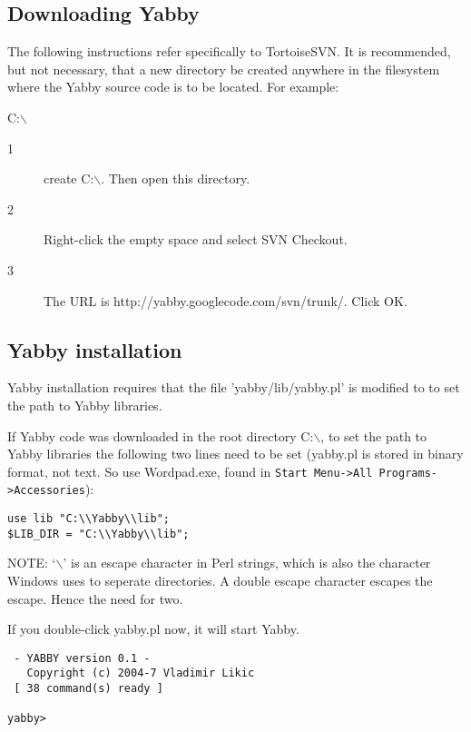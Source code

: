 \subsection{Downloading Yabby}

The following instructions refer specifically to TortoiseSVN. It is
recommended, but not necessary, that a new directory be created anywhere in
the filesystem where the Yabby source code is to be located. For example:

C:{$\backslash$}
\begin{description}
  \item[1] create C:{$\backslash$}. Then open this directory.
  
  \item[2] Right-click the empty space and select SVN Checkout.
  
  \item[3] The URL is http://yabby.googlecode.com/svn/trunk/. Click OK.
\end{description}

\subsection{Yabby installation}

Yabby installation requires that the file 'yabby/lib/yabby.pl' is modified to
to set the path to Yabby libraries.

If Yabby code was downloaded in the root directory C:$\backslash$, to set
the path to Yabby libraries the following two lines need to be set (yabby.pl
is stored in binary format, not text. So use Wordpad.exe, found in
{\tt Start Menu->All Programs->Accessories}):
\begin{verbatim}
use lib "C:\\Yabby\\lib";
$LIB_DIR = "C:\\Yabby\\lib";
\end{verbatim}
NOTE: `{$\backslash$}' is an escape character in Perl strings, which is
also the character Windows uses to seperate directories. A double escape
character escapes the escape. Hence the need for two.

If you double-click yabby.pl now, it will start Yabby.
\begin{verbatim}
 - YABBY version 0.1 - 
   Copyright (c) 2004-7 Vladimir Likic
 [ 38 command(s) ready ]

yabby>
\end{verbatim}

